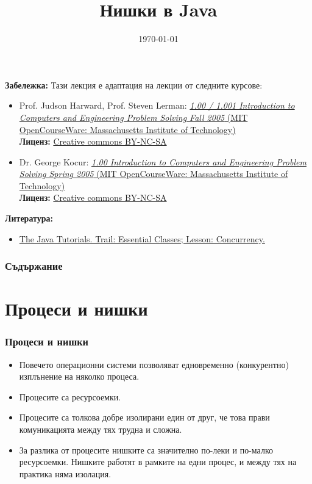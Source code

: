 \documentclass[ignorenonframetext, hyperref=unicode,compress]{beamer}
\title{Нишки в Java}
\date{\today}
\begin{document}
\frame{\titlepage}

\begin{frame}
\small
{\bf Забележка:} Тази лекция е адаптация на лекции от следните
курсове:
\begin{itemize}
  \item 
Prof. Judson Harward, Prof. Steven Lerman:
\href{http://ocw.mit.edu/OcwWeb/Civil-and-Environmental-Engineering/1-00Fall-2005/CourseHome/index.htm}{
{\em 1.00 / 1.001 Introduction to Computers and Engineering Problem Solving  Fall 2005} (MIT OpenCourseWare:
Massachusetts Institute of Technology)}\\
{\bf Лиценз:}
\href{http://ocw.mit.edu/OcwWeb/web/terms/terms/index.htm\#cc}{Creative commons
BY-NC-SA}  
\item Dr. George Kocur: 
\href{http://ocw.mit.edu/OcwWeb/Civil-and-Environmental-Engineering/1-00Spring-2005/CourseHome/index.htm}{
{\em 1.00 Introduction to Computers and Engineering Problem
Solving  Spring 2005} (MIT OpenCourseWare: Massachusetts Institute of
Technology)} \\
{\bf Лиценз:}
\href{http://ocw.mit.edu/OcwWeb/web/terms/terms/index.htm\#cc}{Creative commons
BY-NC-SA}
\end{itemize}

\end{frame}

\begin{frame}
{\bf Литература:} 
\begin{itemize}
\item
\href{http://java.sun.com/docs/books/tutorial/essential/concurrency/index.html}{The
Java Tutorials. Trail: Essential Classes; Lesson: Concurrency.}
\end{itemize}
\end{frame}

\begin{frame}
\frametitle{Съдържание}
\tableofcontents %
\end{frame}


\section{Процеси и нишки}
\begin{frame}[containsverbatim]
\frametitle{Процеси и нишки}
\begin{itemize}
\item Повечето операционни системи позволяват едновременно (конкурентно)
изплънение на няколко процеса.
\item Процесите са ресурсоемки.
\item Процесите са толкова добре изолирани един от друг, че това прави
комуникацията между тях трудна и  сложна.
\item За разлика от процесите нишките са значително по-леки и по-малко
ресурсоемки. Нишките работят в рамките на едни процес, и между тях на практика
няма изолация.
\end{itemize}
\end{frame}
\end{document}
